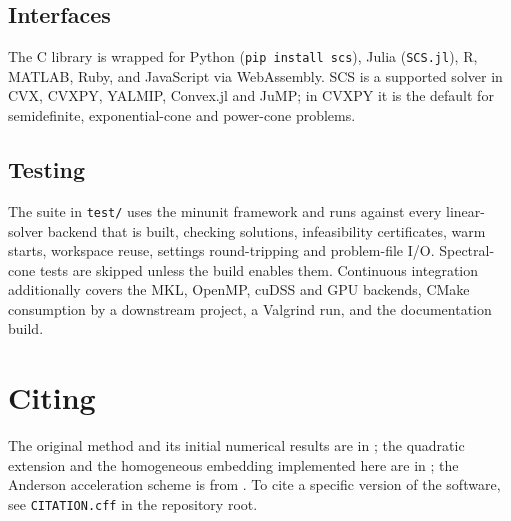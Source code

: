 \documentclass[11pt,a4paper]{article}
\theoremstyle{plain}
\begin{document}
\subsection{Interfaces}

The C library is wrapped for Python (\texttt{pip install scs}), Julia
(\texttt{SCS.jl}), R, MATLAB, Ruby, and JavaScript via WebAssembly. SCS is a
supported solver in CVX, CVXPY, YALMIP, Convex.jl and JuMP; in CVXPY it is the
default for semidefinite, exponential-cone and power-cone problems.

\subsection{Testing}

The suite in \texttt{test/} uses the minunit framework and runs against every
linear-solver backend that is built, checking solutions, infeasibility
certificates, warm starts, workspace reuse, settings round-tripping and
problem-file I/O. Spectral-cone tests are skipped unless the build enables
them. Continuous integration additionally covers the MKL, OpenMP, cuDSS and
GPU backends, CMake consumption by a downstream project, a Valgrind run, and
the documentation build.

\section{Citing}\label{sec:citing}

The original method and its initial numerical results are in
\cite{ocpb:16}; the quadratic extension and the homogeneous embedding
implemented here are in \cite{odonoghue:21}; the Anderson acceleration
scheme is from \cite{aa2020}. To cite a specific version of the software,
see \texttt{CITATION.cff} in the repository root.
\end{document}
